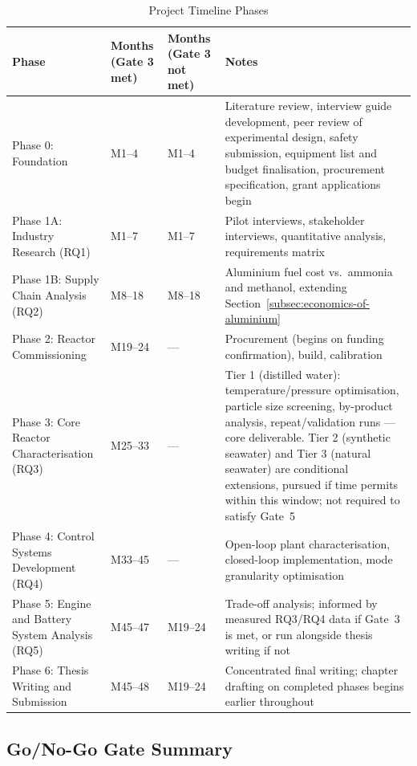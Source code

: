 \documentclass[12pt]{article}
\begin{document}
\begin{table}[h!]
\centering
\small
\setlength{\tabcolsep}{4pt}
\begin{tabularx}{\linewidth}{|p{3.4cm}|p{1.9cm}|p{1.9cm}|X|}
\hline
\textbf{Phase} & \textbf{Months (Gate 3 met)} & \textbf{Months (Gate 3 not met)} & \textbf{Notes} \\
\hline
Phase 0: Foundation & M1--4 & M1--4 & Literature review, interview guide development, peer review of experimental design, safety submission, equipment list and budget finalisation, procurement specification, grant applications begin \\
\hline
Phase 1A: Industry Research (RQ1) & M1--7 & M1--7 & Pilot interviews, stakeholder interviews, quantitative analysis, requirements matrix \\
\hline
Phase 1B: Supply Chain Analysis (RQ2) & M8--18 & M8--18 & Aluminium fuel cost vs.\ ammonia and methanol, extending Section~\ref{subsec:economics-of-aluminium} \\
\hline
Phase 2: Reactor Commissioning & M19--24 & --- & Procurement (begins on funding confirmation), build, calibration \\
\hline
Phase 3: Core Reactor Characterisation (RQ3) & M25--33 & --- & Tier 1 (distilled water): temperature/pressure optimisation, particle size screening, by-product analysis, repeat/validation runs --- core deliverable. Tier 2 (synthetic seawater) and Tier 3 (natural seawater) are conditional extensions, pursued if time permits within this window; not required to satisfy Gate~5 \\
\hline
Phase 4: Control Systems Development (RQ4) & M33--45 & --- & Open-loop plant characterisation, closed-loop implementation, mode granularity optimisation \\
\hline
Phase 5: Engine and Battery System Analysis (RQ5) & M45--47 & M19--24 & Trade-off analysis; informed by measured RQ3/RQ4 data if Gate~3 is met, or run alongside thesis writing if not \\
\hline
Phase 6: Thesis Writing and Submission & M45--48 & M19--24 & Concentrated final writing; chapter drafting on completed phases begins earlier throughout \\
\hline
\end{tabularx}
\caption{Project Timeline Phases}
\label{tab:project-timeline-phases}
\end{table}

\bigskip
\subsection*{Go/No-Go Gate Summary}
\end{document}
